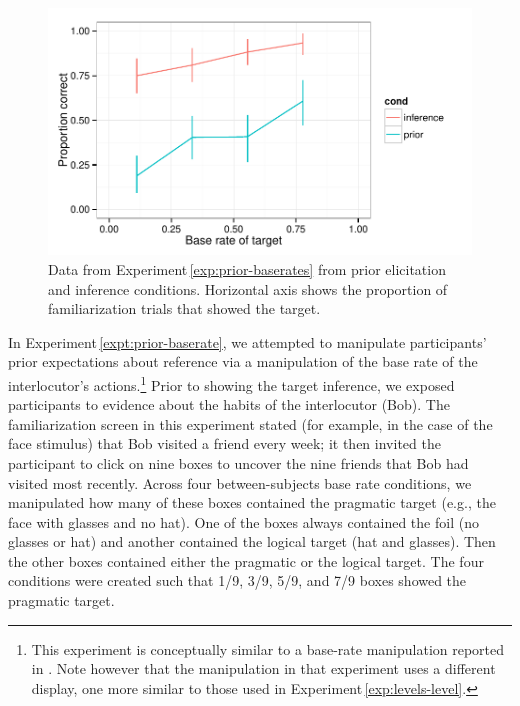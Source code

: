 \documentclass[man,noapacite]{apa2}
\newcounter{Experiment}
\newcommand{\exptref}[1]{Experiment\,\ref{#1}}
\begin{document}
\begin{figure}[t]
  \centering
  \includegraphics[width=5in]{../plots/2-prior-baserates.pdf}
  \caption{\label{fig:prior-baserate} Data from \exptref{exp:prior-baserates} from prior elicitation and inference conditions. Horizontal axis shows the proportion of familiarization trials that showed the target.}
\end{figure}

In \exptref{expt:prior-baserate}, we attempted to manipulate participants' prior expectations about reference via a manipulation of the base rate of the interlocutor's actions.\footnote{This experiment is conceptually similar to a base-rate manipulation reported in . Note however that the manipulation in that experiment uses a different display, one more similar to those used in \exptref{exp:levels-level}.} Prior to showing the target inference, we exposed participants to evidence about the habits of the interlocutor (Bob). The familiarization screen in this experiment stated (for example, in the case of the face stimulus) that Bob visited a friend every week; it then invited the participant to click on nine boxes to uncover the nine friends that Bob had visited most recently. Across four between-subjects base rate conditions, we manipulated how many of these boxes contained the pragmatic target (e.g., the face with glasses and no hat). One of the boxes always contained the foil (no glasses or hat) and another contained the logical target (hat and glasses). Then the other boxes contained either the pragmatic or the logical target. The four conditions were created such that 1/9, 3/9, 5/9, and 7/9 boxes showed the pragmatic target.
\end{document}
